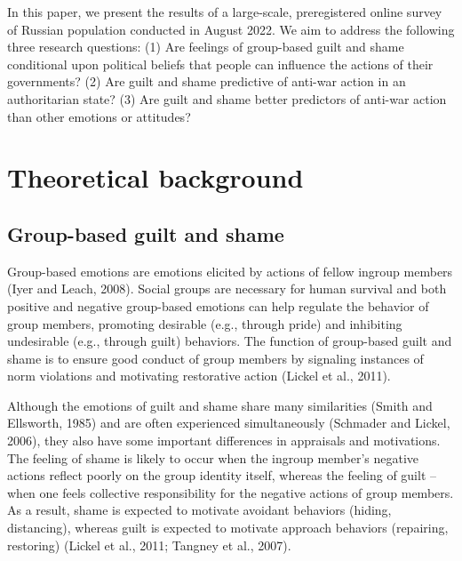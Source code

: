 \documentclass[
]{article}
\begin{document}
In this paper, we present the results of a large-scale, preregistered online survey of Russian population conducted in August 2022. We aim to address the following three research questions: (1) Are feelings of group-based guilt and shame conditional upon political beliefs that people can influence the actions of their governments? (2) Are guilt and shame predictive of anti-war action in an authoritarian state? (3) Are guilt and shame better predictors of anti-war action than other emotions or attitudes?

\hypertarget{theoretical-background}{%
\section*{Theoretical background}\label{theoretical-background}}

\allsectionsfont{\raggedright}

\hypertarget{group-based-guilt-and-shame}{%
\subsection*{Group-based guilt and shame}\label{group-based-guilt-and-shame}}

Group-based emotions are emotions elicited by actions of fellow ingroup members (Iyer and Leach, 2008). Social groups are necessary for human survival and both positive and negative group-based emotions can help regulate the behavior of group members, promoting desirable (e.g., through pride) and inhibiting undesirable (e.g., through guilt) behaviors. The function of group-based guilt and shame is to ensure good conduct of group members by signaling instances of norm violations and motivating restorative action (Lickel et al., 2011).

Although the emotions of guilt and shame share many similarities (Smith and Ellsworth, 1985) and are often experienced simultaneously (Schmader and Lickel, 2006), they also have some important differences in appraisals and motivations. The feeling of shame is likely to occur when the ingroup member's negative actions reflect poorly on the group identity itself, whereas the feeling of guilt -- when one feels collective responsibility for the negative actions of group members. As a result, shame is expected to motivate avoidant behaviors (hiding, distancing), whereas guilt is expected to motivate approach behaviors (repairing, restoring) (Lickel et al., 2011; Tangney et al., 2007).
\end{document}
